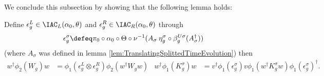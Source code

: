 We conclude this subsection by showing that the following lemma holds:
\begin{lemma}\label{lem:DefinitionOfEpsilons}
	Define $\epsilon^L_g\in\IAC_L(\alpha_0,\theta)$ and $\epsilon^R_g\in\IAC_R(\alpha_0,\theta)$ through
	\begin{align}
		\epsilon_g^\sigma\defeq \pi_0\circ\alpha_0\circ\Theta\circ\nu^{-1}(A_\sigma\:\eta_g^\sigma\circ\beta_{g}^{U\sigma}(A_\sigma^\dagger))
	\end{align}
	(where $A_\sigma$ was defined in lemma \ref{lem:TranslatingSplittedTimeEvolution}) then
	\begin{align}
		\label{eq:TransformationOfKUnderEpsilon}
		w^\dagger \phi_2(W_g)w &= \phi_1(\epsilon_g^L\otimes\epsilon_g^R)\phi_2(w^\dagger W_g w)&
		w^\dagger \phi_1(K_g^\sigma)w&=v^\dagger\phi_1(\epsilon_g^\sigma)v\phi_1(w^\dagger K_g^\sigma w)\phi_1(\epsilon_g^\sigma)^\dagger.
	\end{align}
\end{lemma}
